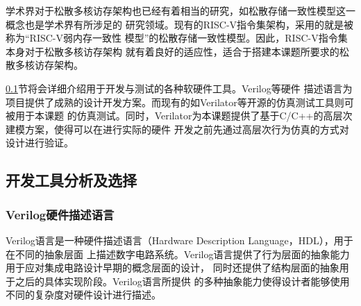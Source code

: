 学术界对于松散多核访存架构也已经有着相当的研究，如松散存储一致性模型这一概念也是学术界有所涉足的
研究领域\cite{adve1996shared}。现有的RISC-V指令集架构，采用的就是被称为“RISC-V弱内存一致性
模型”的松散存储一致性模型\cite{waterman2014risc}。因此，RISC-V指令集本身对于松散多核访存架构
就有着良好的适应性，适合于搭建本课题所要求的松散多核访存架构。

\ref{section:principle_tools}节将会详细介绍用于开发与测试的各种软硬件工具。Verilog等硬件
描述语言为项目提供了成熟的设计开发方案。而现有的如Verilator等开源的仿真测试工具则可被用于本课题
的仿真测试。同时，Verilator为本课题提供了基于C/C++的高层次建模方案，使得可以在进行实际的硬件
开发之前先通过高层次行为仿真的方式对设计进行验证。

\subsection{开发工具分析及选择}
\label{section:principle_tools}

\subsubsection{Verilog硬件描述语言}


Verilog语言是一种硬件描述语言（Hardware Description Language，HDL），用于在不同的抽象层面
上描述数字电路系统。Verilog语言提供了行为层面的抽象能力用于应对集成电路设计早期的概念层面的设计，
同时还提供了结构层面的抽象用于之后的具体实现阶段\cite{thomas2008verilog}。Verilog语言所提供
的多种抽象能力使得设计者能够使用不同的复杂度对硬件设计进行描述。


